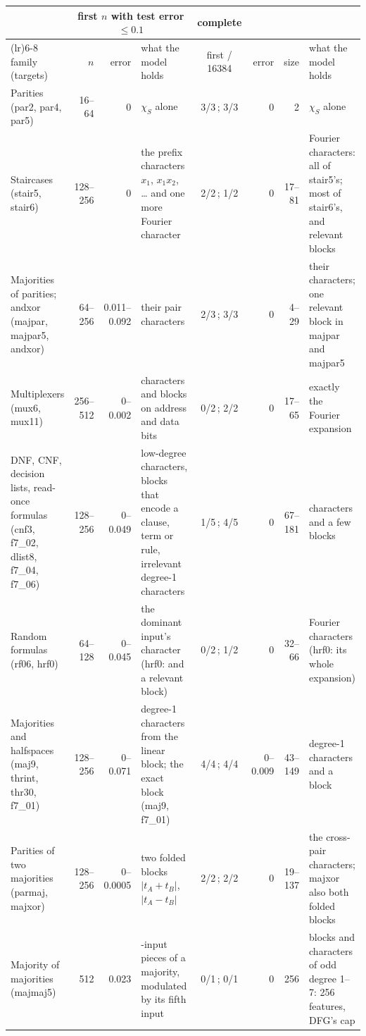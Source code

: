 \begin{tabularx}{\linewidth}{@{}>{\raggedright\arraybackslash}p{2.35cm}rr>{\raggedright\arraybackslash}Xcrr>{\raggedright\arraybackslash}X@{}}
\toprule
& \multicolumn{3}{c}{first $n$ with test error $\le0.1$} & complete & \multicolumn{3}{c}{$n=16384$}\\
\cmidrule(lr){2-4}\cmidrule(lr){6-8}
family (targets) & $n$ & error & what the model holds & first / 16384 & error & size & what the model holds\\
\midrule
Parities (par2, par4, par5) & 16--64 & 0 & $\chi_S$ alone & 3/3\,; 3/3 & 0 & 2 & $\chi_S$ alone\\
Staircases (stair5, stair6) & 128--256 & 0 & the prefix characters $x_1$, $x_1x_2$, \dots{} and one more Fourier character & 2/2\,; 1/2 & 0 & 17--81 & Fourier characters: all of stair5's; most of stair6's, and relevant blocks\\
Majorities of parities; andxor (majpar, majpar5, andxor) & 64--256 & 0.011--0.092 & their pair characters & 2/3\,; 3/3 & 0 & 4--29 & their characters; one relevant block in majpar and majpar5\\
Multiplexers (mux6, mux11) & 256--512 & 0--0.002 & characters and blocks on address and data bits & 0/2\,; 2/2 & 0 & 17--65 & exactly the Fourier expansion\\
DNF, CNF, decision lists, read-once formulas (cnf3, f7\_02, dlist8, f7\_04, f7\_06) & 128--256 & 0--0.049 & low-degree characters, blocks that encode a clause, term or rule, irrelevant degree-1 characters & 1/5\,; 4/5 & 0 & 67--181 & characters and a few blocks\\
Random formulas (rf06, hrf0) & 64--128 & 0--0.045 & the dominant input's character (hrf0: and a relevant block) & 0/2\,; 1/2 & 0 & 32--66 & Fourier characters (hrf0: its whole expansion)\\
Majorities and halfspaces (maj9, thrint, thr30, f7\_01) & 128--256 & 0--0.071 & degree-1 characters from the linear block; the exact block (maj9, f7\_01) & 4/4\,; 4/4 & 0--0.009 & 43--149 & degree-1 characters and a block\\
Parities of two majorities (parmaj, majxor) & 128--256 & 0--0.0005 & two folded blocks $|t_A+t_B|$, $|t_A-t_B|$ & 2/2\,; 2/2 & 0 & 19--137 & the cross-pair characters; majxor also both folded blocks\\
Majority of majorities (majmaj5) & 512 & 0.023 & 4-input pieces of a majority, modulated by its fifth input & 0/1\,; 0/1 & 0 & 256 & blocks and characters of odd degree 1--7: 256 features, DFG's cap\\

\end{tabularx}
